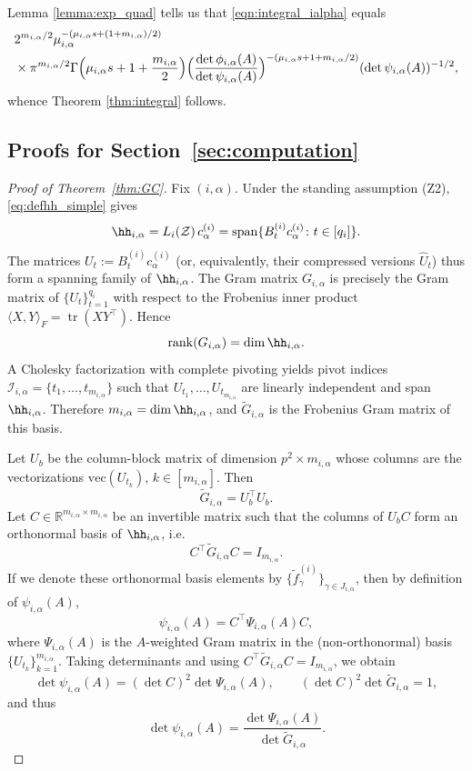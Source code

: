 \documentclass[12pt]{amsart}
\theoremstyle{plain}
\theoremstyle{definition}
\theoremstyle{remark}
\newcommand{\R}{\mathbb{R}}
\newcommand{\1}{\mathbf{1}}
\newcommand{\tr}{\operatorname{tr}}
\begin{document}
Lemma \ref{lemma:exp_quad} tells us that \eqref{eqn:integral_ialpha}
 equals
\begin{align*}
{} & 2^{m_{i,\alpha}/2} \mu_{i,\alpha}^{-(\mu_{i,\alpha} s + (1+m_{i,\alpha})/2)}\\
& \times
\pi^{m_{i,\alpha}/2} \Gamma\Bigl(\mu_{i,\alpha} s + 1 + \frac{m_{i,\alpha}}{2}\Bigr)
\Bigl( \frac{\det \phi_{i,\alpha}(A)}{\det \psi_{i,\alpha}(A)} 
\Bigr)^{-(\mu_{i,\alpha} s + 1+ m_{i,\alpha} /2 )}
 (\det \psi_{i,\alpha}(A))^{-1/2}, 
\end{align*}
whence Theorem \ref{thm:integral} follows. 


\subsection{Proofs for Section~\ref{sec:computation}}
\begin{proof}[Proof of Theorem~\ref{thm:GC}]
Fix $(i,\alpha)$.
Under the standing assumption (Z2), \eqref{eq:defhh_simple} gives
\[
  \hh_{i,\alpha} = L_i(\mathcal{Z})\,c_\alpha^{(i)}
  = \mathrm{span}\{B_t^{(i)}c_\alpha^{(i)} \colon t\in[q_i]\}.
\]
The matrices $U_t := B_t^{(i)}c_\alpha^{(i)}$ (or, equivalently, their compressed
versions $\widehat U_t$) thus form a spanning family of $\hh_{i,\alpha}$.
The Gram matrix $G_{i,\alpha}$ is precisely the Gram matrix of
$\{U_t\}_{t=1}^{q_i}$ with respect to the Frobenius inner product
$\langle X,Y\rangle_F = \tr(XY^\top)$.
Hence
\[
  \mathrm{rank}(G_{i,\alpha}) = \dim \hh_{i,\alpha}.
\]
A Cholesky factorization with complete pivoting yields pivot indices
$\mathcal{I}_{i,\alpha} = \{t_1,\dots,t_{m_{i,\alpha}}\}$ such that
$U_{t_1},\dots,U_{t_{m_{i,\alpha}}}$ are linearly independent and span
$\hh_{i,\alpha}$. Therefore $m_{i,\alpha} = \dim\hh_{i,\alpha}$,
and $\widetilde G_{i,\alpha}$ is the Frobenius Gram matrix of this basis.

Let $U_b$ be the column-block matrix of dimension
$p^2\times m_{i,\alpha}$ whose columns are the vectorizations
$\mathrm{vec}(U_{t_k})$, $k\in [m_{i,\alpha}]$. Then
\[
  \widetilde G_{i,\alpha} = U_b^\top U_b.
\]
Let $C\in\R^{m_{i,\alpha}\times m_{i,\alpha}}$ be an invertible matrix such that
the columns of $U_b C$ form an orthonormal basis of $\hh_{i,\alpha}$,
i.e.
\[
  C^\top \widetilde G_{i,\alpha} C = I_{m_{i,\alpha}}.
\]
If we denote these orthonormal basis elements by
$\{\tilde f_\gamma^{(i)}\}_{\gamma\in J_{i,\alpha}}$, then
by definition of $\psi_{i,\alpha}(A)$,
\[
  \psi_{i,\alpha}(A)
  = C^\top \Psi_{i,\alpha}(A) C,
\]
where $\Psi_{i,\alpha}(A)$ is the $A$-weighted Gram matrix in the
(non-orthonormal) basis $\{U_{t_k}\}_{k=1}^{m_{i,\alpha}}$.
Taking determinants and using
$C^\top \widetilde G_{i,\alpha} C = I_{m_{i,\alpha}}$,
we obtain
\[
  \det\psi_{i,\alpha}(A)
  = (\det C)^2 \det\Psi_{i,\alpha}(A),
  \qquad
  (\det C)^2 \det\widetilde G_{i,\alpha} = 1,
\]
and thus
\[
  \det\psi_{i,\alpha}(A)
  = \frac{\det\Psi_{i,\alpha}(A)}
         {\det\widetilde G_{i,\alpha}}.
\]


\end{proof}
\end{document}
